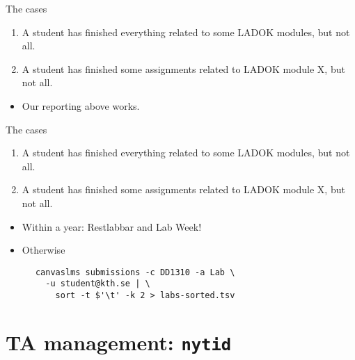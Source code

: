 \begin{frame}[fragile]
  \begin{block}{The cases}
    \begin{enumerate}
      \item A student has finished everything related to some LADOK modules, 
        but not all.
      \item A student has finished some assignments related to LADOK module X, 
        but not all.
    \end{enumerate}
  \end{block}

  \begin{solution}[Case 1]
    \begin{itemize}
      \item Our reporting above works.
    \end{itemize}
  \end{solution}
\end{frame}

\begin{frame}[fragile]
  \begin{block}{The cases}
    \begin{enumerate}
      \item A student has finished everything related to some LADOK modules, 
        but not all.
      \item A student has finished some assignments related to LADOK module X, 
        but not all.
    \end{enumerate}
  \end{block}

  \begin{solution}[Case 2]
    \begin{itemize}
      \item Within a year: Restlabbar and Lab Week!
      \item Otherwise
    \end{itemize}
    \begin{verbatim}
      canvaslms submissions -c DD1310 -a Lab \
        -u student@kth.se | \
          sort -t $'\t' -k 2 > labs-sorted.tsv
    \end{verbatim}
  \end{solution}
\end{frame}

\section[TA management]{TA management: \texttt{nytid}}

